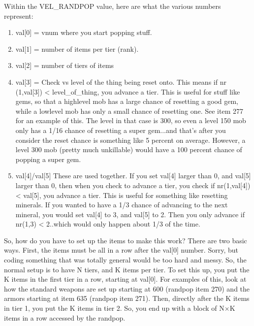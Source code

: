 Within the VEL\_RANDPOP value, here are what the various numbers
represent:

\begin{enumerate}

\item val[0] = vnum where you start popping stuff.

\item val[1] = number of items per tier (rank).

\item val[2] = number of tiers of items

\item val[3] = Check vs level of the thing being reset onto. This 
	means if nr (1,val[3]) < level\_of\_thing, you advance a
	tier. This is useful for stuff like gems, so that a highlevel
	mob has a large chance of resetting a good gem,
	while a lowlevel mob has only a small chance of resetting one.
See item 277 for an example of this. The level in that case is 300,
so even a level 150 mob only has a 1/16 chance of resetting a super
gem...and that's after you consider the reset chance is something like
5 percent on average. However, a level 300 mob (pretty much unkillable) would
have a 100 percent chance of popping a super gem.

\item val[4]/val[5] These are used together. If you set val[4] larger
than 0, and val[5] larger than 0, then when you check to advance a
tier, you check if nr(1,val[4]) < val[5], you advance a tier. This is
useful for something like resetting minerals. If you wanted to have
a 1/3 chance of advancing to the next mineral, you would set
val[4] to 3, and val[5] to 2. Then you only advance if nr(1,3) <
2..which would only happen about 1/3 of the time. 
\end{enumerate}

So, how do you have to set up the items to make this work? There are
two basic ways. First, the items must be all in a row after the val[0]
number. Sorry, but coding something that was totally general would be
too hard and messy. So, the normal setup is to have N tiers, and K
items per tier. To set this up, you put the K items in the first tier
in a row, starting at val[0]. For examples of this, look at how the
standard weapons are set up starting at 600 (randpop item 270) and the
armors starting at item 635 (randpop item 271). Then, directly after
the K items in tier 1, you put the K items in tier 2. So, you end up
with a block of N$\times$K items in a row accessed by the randpop.

